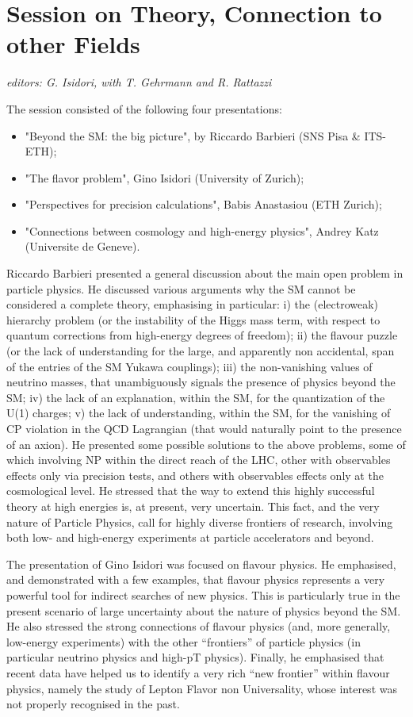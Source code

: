 \section{Session on Theory, Connection to other Fields}\label{theory}{\it editors: G. Isidori, with T. Gehrmann and R. Rattazzi}

\noindent The session consisted of the following four presentations: 
\begin{itemize} \setlength{\itemsep}{-1ex}
\item "Beyond the SM: the big picture",  by  Riccardo Barbieri (SNS Pisa \& ITS-ETH); 
\item "The flavor problem", Gino Isidori (University of Zurich); 
\item "Perspectives for precision calculations",  Babis Anastasiou (ETH Zurich); 
\item  "Connections between cosmology and high-energy physics", Andrey Katz (Universite de Geneve).
\end{itemize}

\noindent Riccardo Barbieri presented a general discussion about the main open problem in particle physics. 
He  discussed various arguments why the SM cannot be considered a complete theory,
emphasising in particular:  i) the (electroweak) hierarchy problem (or the instability of the Higgs mass term,
with respect to quantum corrections from high-energy degrees of freedom); 
ii) the flavour puzzle (or the lack of understanding for the large, 
and apparently non accidental,  span of the entries of the SM Yukawa couplings); 
iii) the non-vanishing values of neutrino masses, that unambiguously 
signals the presence of physics beyond the SM;
iv)  the lack  of an explanation, within the SM, for the quantization of the U(1) charges; 
v) the lack of understanding, within the SM, for the vanishing of CP 
violation in the QCD Lagrangian (that would naturally point to the presence of an axion).
He presented some possible solutions to the above problems, some of which involving 
NP within the direct reach of the LHC, other with observables effects only via precision
tests, and others with observables effects only at the cosmological level. 
He stressed  that the way to extend this highly successful theory 
at high energies is, at present, very uncertain.  This fact, and the very nature of Particle Physics,
call for highly diverse frontiers of research, involving both low- and high-energy experiments
at particle accelerators and beyond.
\medskip

\noindent  The presentation of Gino Isidori was focused on flavour physics. He emphasised, and 
demonstrated with a few examples, that flavour physics represents
a very powerful tool for indirect searches of new physics. This is particularly true in the 
present scenario of large uncertainty about the nature of physics beyond the SM. 
He also stressed the strong connections of flavour physics (and, more generally, low-energy experiments) 
with the other ``frontiers'' of particle physics (in particular neutrino physics and high-pT physics).
Finally, he emphasised that recent data have helped us to identify a very rich ``new frontier''
within flavour physics, namely the study of Lepton Flavor non Universality, whose interest 
was not properly recognised in the past. 
\medskip

